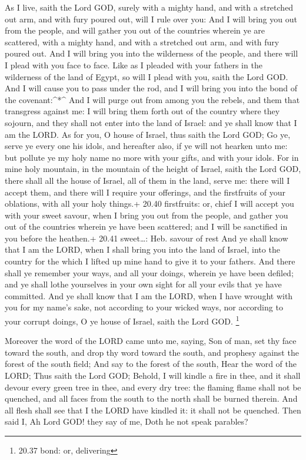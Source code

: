  As I live, saith the Lord GOD, surely with a mighty hand,
and with a stretched out arm, and with fury poured out, will I rule over
you:  And I will bring you out from the people, and will
gather you out of the countries wherein ye are scattered, with a mighty
hand, and with a stretched out arm, and with fury poured out.
 And I will bring you into the wilderness of the people,
and there will I plead with you face to face.  Like as I
pleaded with your fathers in the wilderness of the land of Egypt, so
will I plead with you, saith the Lord GOD.  And I will
cause you to pass under the rod, and I will bring you into the bond of
the covenant:\^{}*\^{}  And I will purge out from among you
the rebels, and them that transgress against me: I will bring them forth
out of the country where they sojourn, and they shall not enter into the
land of Israel: and ye shall know that I am the LORD.  As
for you, O house of Israel, thus saith the Lord GOD; Go ye, serve ye
every one his idols, and hereafter also, if ye will not hearken unto me:
but pollute ye my holy name no more with your gifts, and with your
idols.  For in mine holy mountain, in the mountain of the
height of Israel, saith the Lord GOD, there shall all the house of
Israel, all of them in the land, serve me: there will I accept them, and
there will I require your offerings, and the firstfruits of your
oblations, with all your holy things.+ 20.40 firstfruits: or, chief
 I will accept you with your sweet savour, when I bring you
out from the people, and gather you out of the countries wherein ye have
been scattered; and I will be sanctified in you before the heathen.+
20.41 sweet\ldots: Heb. savour of rest  And ye shall know
that I am the LORD, when I shall bring you into the land of Israel, into
the country for the which I lifted up mine hand to give it to your
fathers.  And there shall ye remember your ways, and all
your doings, wherein ye have been defiled; and ye shall lothe yourselves
in your own sight for all your evils that ye have committed.
 And ye shall know that I am the LORD, when I have wrought
with you for my name's sake, not according to your wicked ways, nor
according to your corrupt doings, O ye house of Israel, saith the Lord
GOD. \footnote{20.37 bond: or, delivering}

 Moreover the word of the LORD came unto me, saying,
 Son of man, set thy face toward the south, and drop thy
word toward the south, and prophesy against the forest of the south
field;  And say to the forest of the south, Hear the word
of the LORD; Thus saith the Lord GOD; Behold, I will kindle a fire in
thee, and it shall devour every green tree in thee, and every dry tree:
the flaming flame shall not be quenched, and all faces from the south to
the north shall be burned therein.  And all flesh shall see
that I the LORD have kindled it: it shall not be quenched. 
Then said I, Ah Lord GOD! they say of me, Doth he not speak parables?

